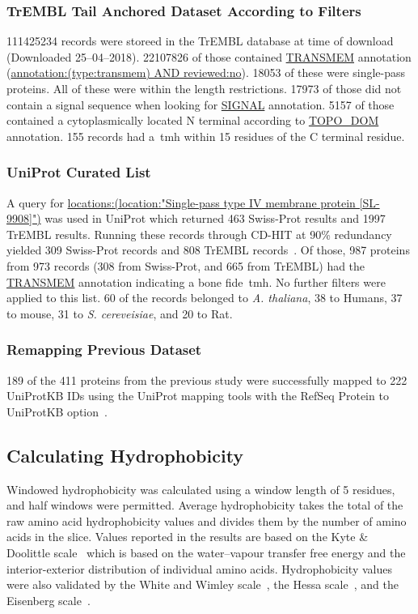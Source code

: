 \subsubsection{TrEMBL Tail Anchored Dataset According to Filters}
111425234 records were storeed in the TrEMBL database at time of download (Downloaded 25--04--2018).
22107826 of those contained \url{TRANSMEM} annotation (\url{annotation:(type:transmem) AND reviewed:no}).
18053 of these were single-pass proteins.
All of these were within the length restrictions.
17973 of those did not contain a signal sequence when looking for \url{SIGNAL} annotation.
5157 of those contained a cytoplasmically located N terminal according to \url{TOPO_DOM} annotation.
155 records had a~\gls{tmh} within 15 residues of the C terminal residue.

\subsubsection{UniProt Curated List}
A query for \url{locations:(location:"Single-pass type IV membrane protein [SL-9908]")} was used in UniProt which returned 463 Swiss-Prot results and 1997 TrEMBL results.
Running these records through CD-HIT at 90\% redundancy yielded 309 Swiss-Prot records and 808 TrEMBL records~\cite{Huang2010, Wu2011}.
Of those, 987 proteins from 973 records (308 from Swiss-Prot, and 665 from TrEMBL) had the \url{TRANSMEM} annotation indicating a bone fide~\gls{tmh}.
No further filters were applied to this list.
60 of the records belonged to \textit{A. thaliana}, 38 to Humans, 37 to mouse, 31 to \textit{S. cereveisiae}, and 20 to Rat.


\subsubsection{Remapping Previous Dataset}
189 of the 411 proteins from the previous study were successfully mapped to 222 UniProtKB IDs using the UniProt mapping tools with the RefSeq Protein to UniProtKB option~\cite{TheUniProtConsortium2014}.

\subsection{Calculating Hydrophobicity}
Windowed hydrophobicity was calculated using a window length of 5 residues, and half windows were permitted.
Average hydrophobicity takes the total of the raw amino acid hydrophobicity values and divides them by the number of amino acids in the slice.
Values reported in the results are based on the Kyte \& Doolittle scale~\cite{Kyte1982} which is based on the water\---vapour transfer free energy and the interior-exterior distribution of individual amino acids.
Hydrophobicity values were also validated by the White and Wimley scale~\cite{White1999}, the Hessa scale~\cite{Hessa2005}, and the Eisenberg scale~\cite{Eisenberg1984}.
